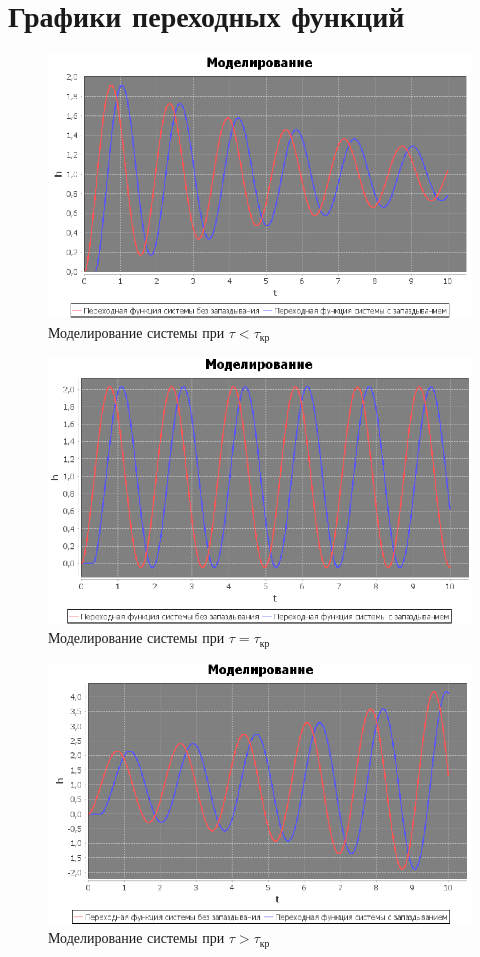 \documentclass[12pt]{article}
\begin{document}
\section{Графики переходных функций}
\begin{figure}[h!]
     \centering
    \includegraphics[width = \linewidth]{моделирование 1.png}
    \caption{Моделирование системы при $\tau < \tau_{кр}$}
\end{figure}
\begin{figure}[h!]
     \centering
    \includegraphics[width = \linewidth]{моделирование 2.png}
    \caption{Моделирование системы при $\tau = \tau_{кр}$}
\end{figure} 
\newpage
\begin{figure}[h!]
     \centering
    \includegraphics[width = \linewidth]{моделирование 3.png}
    \caption{Моделирование системы при $\tau > \tau_{кр}$}
\end{figure} 
\end{document}
